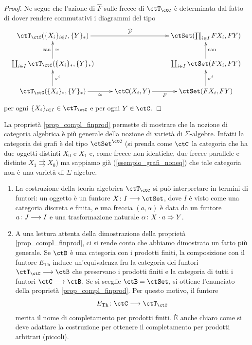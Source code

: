 \begin{proof}
 Ne segue che l'azione di \(\widehat{F}\) sulle frecce di \(\ctT_\ctC\) è determinata dal fatto di dover rendere commutativi
 i diagrammi del tipo
 \[\xymatrix{\ctT_\ctC(\{X_i\}_{i \in I},\{Y\}_{\ast}) \ar[rr]^-{\widehat{F}} & & \ctSet(\prod_{i \in I}FX_i, FY) \\
  \cop_{i \in I}\ctT_\ctC(\{X_i\}_{\ast},\{Y\}_{\ast}) \ar[u]^{\mathrm{can}}_{\simeq} & & \cop_{i \in I}\ctSet(FX_i,FY) \ar[u]_{\mathrm{can}} \\
  \ctT_\ctC(\{X_i\}_{\ast},\{Y\}_{\ast}) \ar[u]_{\sigma^i} \ar[r]_-{\simeq} & \ctC(X_i,Y) \ar[r]_-{F} & \ctSet(FX_i,FY) \ar[u]_{\sigma^i} }\]
 per ogni \(\{X_i\}_{i \in I} \in \ctT_\ctC\) e per ogni \(Y \in \ctC\).
\end{proof}

\begin{example}\label{esempio_grafi_alg}
 La proprietà \ref{prop_compl_finprod} permette di mostrare che la nozione di categoria algebrica è più generale della nozione
 di varietà di \(\Sigma\)-algebre. Infatti la categoria dei grafi è del tipo \(\ctSet^{\ctC}\) (si prenda come \(\ctC\) la categoria che ha
 due oggetti distinti \(X_0\) e \(X_1\) e, come frecce non identiche, due frecce parallele e distinte \(X_1 \rightrightarrows X_0\)) ma sappiamo
 già (\ref{esempio_grafi_noneq}) che tale categoria non è una varietà di \(\Sigma\)-algebre.
\end{example}

\begin{remark}\label{oss_compl_finprod}
 \hfill
 \begin{enumerate}
  \item La costruzione della teoria algebrica \(\ctT_{\ctC}\) si può interpretare in termini di funtori: un oggetto è un funtore
        \(X \colon I \fun \ctSet\), dove \(I\) è visto come una categoria discreta e finita, e una freccia \((a,\alpha)\) è data da
        un funtore \(a \colon J \longrightarrow I\) e una trasformazione naturale \(\alpha \colon X \cdot a \Rightarrow Y\).
  \item A una lettura attenta della dimostrazione della proprietà \ref{prop_compl_finprod}, ci si rende conto che abbiamo dimostrato un
        fatto più generale. Se \(\ctB\) è una categoria con i prodotti finiti, la composizione con il funtore \(E_{\mathrm{Th}}\) induce un'equivalenza
        fra la categoria dei funtori \(\ctT_{\ctC} \fun \ctB\) che preservano i prodotti finiti e la categoria di tutti i funtori \(\ctC \fun \ctB\). Se si sceglie
        \(\ctB = \ctSet\), si ottiene l'enunciato della proprietà \ref{prop_compl_finprod}. Per questo motivo, il funtore
        \[E_{\mathrm{Th}} \colon \ctC \fun \ctT_{\ctC}\]
        merita il nome di completamento per prodotti finiti. È anche chiaro come si deve adattare la costruzione per ottenere il completamento per
        prodotti arbitrari (piccoli).
 \end{enumerate}
\end{remark}

